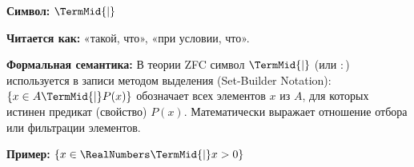 
\hypertarget{axiom-mid}{}
\begin{object} %

\textbf{Символ:} $\TermMid{\mid}$

\textbf{Читается как:} «такой, что», «при условии, что».

\textbf{Формальная семантика:}
В теории  ZFC символ $\TermMid{\mid}$ (или $\colon$) используется в записи  методом выделения (Set-Builder Notation): $\{x \in A \TermMid{\mid} P(x)\}$ обозначает  всех элементов $x$ из $A$, для которых истинен предикат (свойство) $P(x)$.
Математически выражает отношение отбора или фильтрации элементов.

\textbf{Пример:} $\{x \in \RealNumbers \TermMid{\mid} x > 0\}$
\end{object}